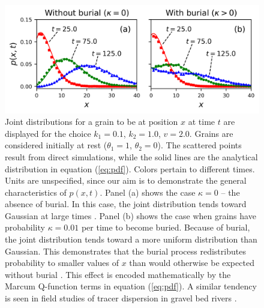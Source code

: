 \documentclass[]{agujournal2018}
\begin{document}
\begin{figure}
	\includegraphics[width=\linewidth,keepaspectratio]{./figures/pdf-plot.png}
	\caption{Joint distributions for a grain to be at position $x$ at time $t$ are displayed for the choice $k_1=0.1$, $k_2=1.0$, $v=2.0$. Grains are considered initially at rest ($\theta_1=1$, $\theta_2=0$). The scattered points result from direct simulations, while the solid lines are the analytical distribution in equation (\ref{eq:pdf}). Colors pertain to different times. Units are unspecified, since our aim is to demonstrate the general characteristics of $p(x,t)$. Panel (a) shows the case $\kappa=0$ -- the absence of burial.
	In this case, the joint distribution tends toward Gaussian at large times \citep[e.g.][]{Einstein1937,Lisle1998}. Panel (b) shows the case when grains have probability $\kappa = 0.01$ per time to become buried.
	Because of burial, the joint distribution tends toward a more uniform distribution than Gaussian. This demonstrates that the burial process redistributes probability to smaller values of $x$ than would otherwise be expected without burial \citep[c.f.][]{Wu2019}. This effect is encoded mathematically by the Marcum Q-function terms in equation  (\ref{eq:pdf}). A similar tendency is seen in field studies of tracer dispersion in gravel bed rivers \citep[e.g.][]{Hassan1994}.}
	\label{fig:pdfs}
\end{figure}
\end{document}

